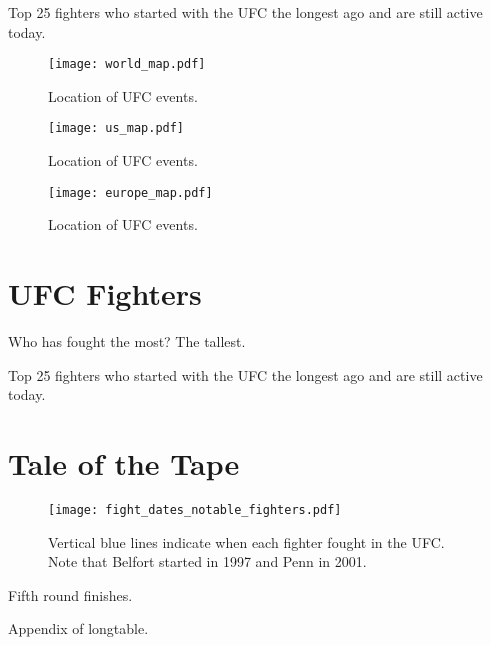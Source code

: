 \documentclass[10pt]{article}
\begin{document}
\begin{center}
\begin{table}[h]

\caption{Top 25 fighters who started with the UFC the longest ago and are still active today.}
\end{table}
\end{center}

\begin{figure}[h]
\begin{center}
\texttt{[image: world\_map.pdf]}
\caption{Location of UFC events.}
\end{center}
\end{figure}

\begin{figure}[h]
\begin{center}
\texttt{[image: us\_map.pdf]}
\caption{Location of UFC events.}
\end{center}
\end{figure}

\begin{figure}[h]
\begin{center}
\texttt{[image: europe\_map.pdf]}
\caption{Location of UFC events.}
\end{center}
\end{figure}

\section{UFC Fighters}

Who has fought the most? The tallest.

\begin{center}
\begin{table}[h]

\caption{Top 25 fighters who started with the UFC the longest ago and are still active today.}
\end{table}
\end{center}

\section{Tale of the Tape}

\begin{figure}[h]
\begin{center}
\texttt{[image: fight\_dates\_notable\_fighters.pdf]}
\caption{Vertical blue lines indicate when each fighter fought in the UFC. Note that Belfort started
in 1997 and Penn in 2001.}
\end{center}
\end{figure}




Fifth round finishes.

Appendix of longtable.
\end{document}
